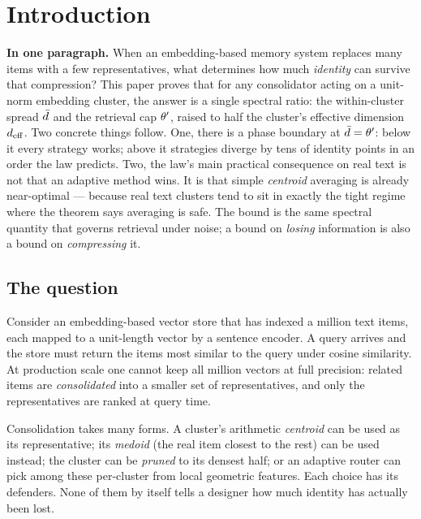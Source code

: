 \section{Introduction}
\label{sec:intro}

\begin{intuition}
\textbf{In one paragraph.} When an embedding-based memory system
replaces many items with a few representatives, what determines how
much \emph{identity} can survive that compression? This paper proves
that for any consolidator acting on a unit-norm embedding cluster, the
answer is a single spectral ratio: the within-cluster spread $\bar{d}$
and the retrieval cap $\theta'$, raised to half the cluster's
effective dimension ${d_{\mathrm{eff}}}$. Two concrete things follow. One, there is
a phase boundary at $\bar{d} = \theta'$: below it every strategy
works; above it strategies diverge by tens of identity points in an
order the law predicts. Two, the law's main practical consequence on
real text is not that an adaptive method wins. It is that simple
\emph{centroid} averaging is already near-optimal --- because real
text clusters tend to sit in exactly the tight regime where the
theorem says averaging is safe. The bound is the same spectral
quantity that governs retrieval under noise; a bound on \emph{losing}
information is also a bound on \emph{compressing} it.
\end{intuition}

\subsection{The question}
\label{sec:intro:question}

Consider an embedding-based vector store that has indexed a million
text items, each mapped to a unit-length vector by a sentence encoder.
A query arrives and the store must return the items most similar to
the query under cosine similarity. At production scale one cannot
keep all million vectors at full precision: related items are
\emph{consolidated} into a smaller set of representatives, and only
the representatives are ranked at query time.

Consolidation takes many forms. A cluster's arithmetic
\emph{centroid} can be used as its representative; its \emph{medoid}
(the real item closest to the rest) can be used instead; the cluster
can be \emph{pruned} to its densest half; or an adaptive router can
pick among these per-cluster from local geometric features. Each
choice has its defenders. None of them by itself tells a designer
how much identity has actually been lost.

